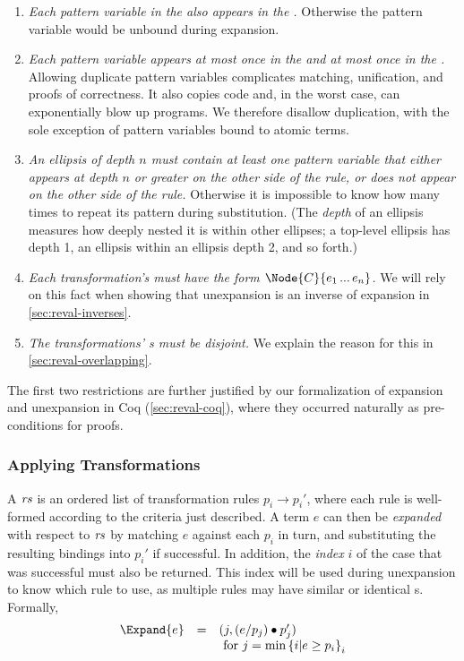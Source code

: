 \begin{enumerate}
\item \emph{Each pattern variable in the  also appears in the
  .} Otherwise the pattern variable would be unbound during expansion.
\item \emph{Each pattern variable appears at most once in the  and at
  most once in the .}
  Allowing duplicate pattern variables complicates matching, unification,
  and proofs of correctness. It also copies code
  and, in the worst case, can exponentially blow up programs.
  We therefore disallow duplication,
  with the sole exception of pattern variables bound to atomic terms.
\item \emph{An ellipsis of depth $n$ must contain at least one pattern variable
  that either appears at depth $n$ or greater on the other side of the
  rule, or does not appear on the other side of the rule.} Otherwise it is
  impossible to know how many times to repeat its pattern during
  substitution. (The \emph{depth} of an ellipsis measures how deeply nested
  it is within other ellipses; a top-level ellipsis has depth 1, an
  ellipsis within an ellipsis depth 2, and so forth.)
\item \emph{Each transformation's  must have the form
  $\Node{C}{e_1 \dd e_n}$.} We will rely on this fact when showing that
  unexpansion is an inverse of expansion in \cref{sec:reval-inverses}.
\item \emph{The transformations' s must be disjoint.} We
  explain the reason for this in \cref{sec:reval-overlapping}.
\end{enumerate}
The first two restrictions are further justified by our formalization of
expansion and unexpansion in Coq (\cref{sec:reval-coq}), 
where they occurred naturally as pre-conditions
for proofs.

\subsubsection{Applying Transformations}

A \emph{} $\mathit{rs}$ is an ordered list of transformation
rules $p_i \to p_i'$, where each rule is well-formed according to the
criteria just described.
A term $e$ can then be \emph{expanded} with respect to
$\mathit{rs}$ by matching $e$ against each $p_i$ in turn, and substituting
the resulting bindings into $p_i'$ if successful. In addition, the
\emph{index} $i$ of the case that was successful
must also be returned. This index will be used during unexpansion
to know which rule to use, as multiple rules may have similar or identical
s. Formally,
\[\begin{array}{lllll}
   \Expand{e} &=&
    (j, (e \match p_j) \subs p_j') \\
    &&\text{ for }
      j = \min \left\{ i | e \geq p_i \right\}_i \\
\end{array}\]

